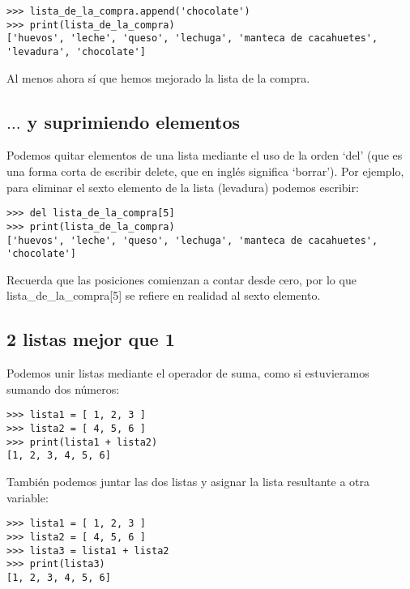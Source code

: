 \begin{listing}
\begin{verbatim}
>>> lista_de_la_compra.append('chocolate')
>>> print(lista_de_la_compra)
['huevos', 'leche', 'queso', 'lechuga', 'manteca de cacahuetes', 'levadura', 'chocolate']
\end{verbatim}
\end{listing}

Al menos ahora sí que hemos mejorado la lista de la compra.

\subsection*{\color{BrickRed}$\ldots$ y suprimiendo elementos}

Podemos quitar elementos de una lista mediante el uso de la orden `del' (que es una forma corta de escribir delete, que en inglés significa `borrar').  Por ejemplo, para eliminar el sexto elemento de la lista (levadura) podemos escribir:

\begin{listing}
\begin{verbatim}
>>> del lista_de_la_compra[5]
>>> print(lista_de_la_compra)
['huevos', 'leche', 'queso', 'lechuga', 'manteca de cacahuetes', 'chocolate']
\end{verbatim}
\end{listing}

Recuerda que las posiciones comienzan a contar desde cero, por lo que lista\_de\_la\_compra[5] se refiere en realidad al sexto elemento.

\subsection*{\color{BrickRed}2 listas mejor que 1}

Podemos unir listas mediante el operador de suma, como si estuvieramos sumando dos números:

\begin{listing}
\begin{verbatim}
>>> lista1 = [ 1, 2, 3 ]
>>> lista2 = [ 4, 5, 6 ]
>>> print(lista1 + lista2)
[1, 2, 3, 4, 5, 6]
\end{verbatim}
\end{listing}

\noindent
También podemos juntar las dos listas y asignar la lista resultante a otra variable:

\begin{listing}
\begin{verbatim}
>>> lista1 = [ 1, 2, 3 ]
>>> lista2 = [ 4, 5, 6 ]
>>> lista3 = lista1 + lista2
>>> print(lista3)
[1, 2, 3, 4, 5, 6]
\end{verbatim}
\end{listing}

